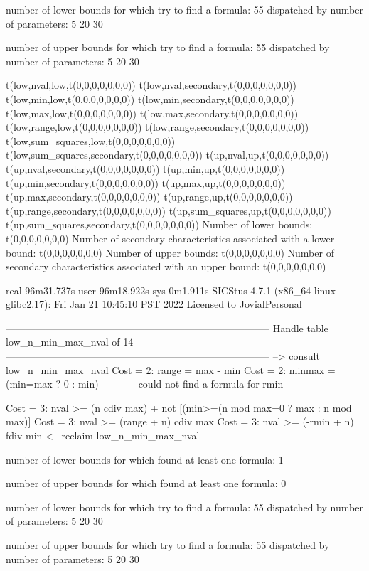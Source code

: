 number of lower bounds for which try to find a formula: 55
dispatched by number of parameters: 5  20  30

number of upper bounds for which try to find a formula: 55
dispatched by number of parameters: 5  20  30

t(low,nval,low,t(0,0,0,0,0,0,0))
t(low,nval,secondary,t(0,0,0,0,0,0,0))
t(low,min,low,t(0,0,0,0,0,0,0))
t(low,min,secondary,t(0,0,0,0,0,0,0))
t(low,max,low,t(0,0,0,0,0,0,0))
t(low,max,secondary,t(0,0,0,0,0,0,0))
t(low,range,low,t(0,0,0,0,0,0,0))
t(low,range,secondary,t(0,0,0,0,0,0,0))
t(low,sum_squares,low,t(0,0,0,0,0,0,0))
t(low,sum_squares,secondary,t(0,0,0,0,0,0,0))
t(up,nval,up,t(0,0,0,0,0,0,0))
t(up,nval,secondary,t(0,0,0,0,0,0,0))
t(up,min,up,t(0,0,0,0,0,0,0))
t(up,min,secondary,t(0,0,0,0,0,0,0))
t(up,max,up,t(0,0,0,0,0,0,0))
t(up,max,secondary,t(0,0,0,0,0,0,0))
t(up,range,up,t(0,0,0,0,0,0,0))
t(up,range,secondary,t(0,0,0,0,0,0,0))
t(up,sum_squares,up,t(0,0,0,0,0,0,0))
t(up,sum_squares,secondary,t(0,0,0,0,0,0,0))
Number of lower bounds:                                             t(0,0,0,0,0,0,0)
Number of secondary characteristics associated with a lower bound:  t(0,0,0,0,0,0,0)
Number of upper bounds:                                             t(0,0,0,0,0,0,0)
Number of secondary characteristics associated with an upper bound: t(0,0,0,0,0,0,0)

real	96m31.737s
user	96m18.922s
sys	0m1.911s
SICStus 4.7.1 (x86_64-linux-glibc2.17): Fri Jan 21 10:45:10 PST 2022
Licensed to JovialPersonal


--------------------------------------------------------------------------------
Handle table low_n_min_max_nval of 14
--------------------------------------------------------------------------------
--> consult low_n_min_max_nval
Cost =  2:  range  = max - min
Cost =  2:  minmax = (min=max ? 0 : min)
----------
could not find a formula for rmin

Cost =  3:  nval >= (n cdiv max) + not [(min>=(n mod max=0 ? max : n mod max)] %
Cost =  3:  nval >= (range + n) cdiv max
Cost =  3:  nval >= (-rmin + n) fdiv min %
<-- reclaim low_n_min_max_nval

number of lower bounds for which found at least one formula: 1

number of upper bounds for which found at least one formula: 0

number of lower bounds for which try to find a formula: 55
dispatched by number of parameters: 5  20  30

number of upper bounds for which try to find a formula: 55
dispatched by number of parameters: 5  20  30

